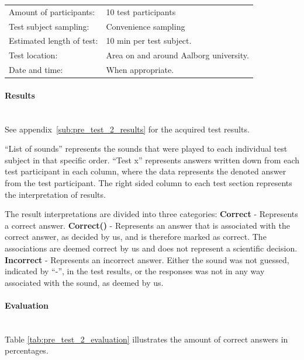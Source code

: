 \begin{tabular}{l l}
Amount of participants: & 10 test participants \\
Test subject sampling: & Convenience sampling \\
Estimated length of test: & 10 min per test subject. \\
Test location: & Area on and around Aalborg university. \\
Date and time: & When appropriate.
\end{tabular}


\paragraph{Results} %
\label{par:pre_test_2_results}
\hspace{0pt} \\
See appendix~\ref{sub:pre_test_2_results} for the acquired test results.

\enquote{List of sounds} represents the sounds that were played to each individual test subject in that specific order.
\enquote{Test x} represents answers written down from each test participant in each column, where the data represents the denoted answer from the test participant.
The right sided column to each test section represents the interpretation of results.

The result interpretations are divided into three categories: \newline
\textbf{Correct} - Represents a correct answer. \newline
\textbf{Correct()} - Represents an answer that is associated with the correct answer, as decided by us, and is therefore marked as correct. 
The associations are deemed correct by us and does not represent a scientific decision. \newline
\textbf{Incorrect} - Represents an incorrect answer. 
Either the sound was not guessed, indicated by \enquote{-}, in the test results, or the responses was not in any way associated with the sound, as deemed by us.

\pagebreak[3]
\paragraph{Evaluation} %
\label{par:pre_test_2_evaluation}
\hspace{0pt} \\
Table \ref{tab:pre_test_2_evaluation} illustrates the amount of correct answers in percentages.

